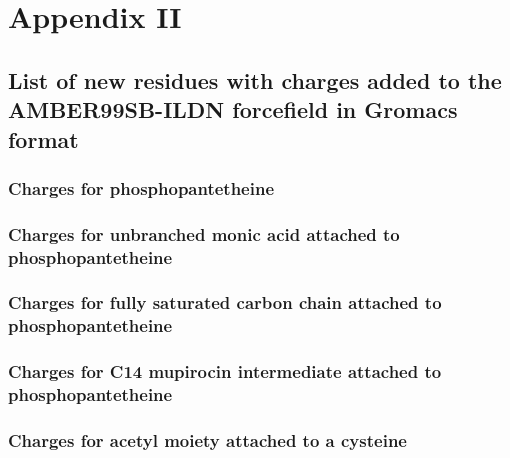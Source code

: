 \chapter{Appendix II}
\label{cha:AppendixII}
\begin{singlespacing}

%

\section{List of new residues with charges added to the AMBER99SB-ILDN forcefield in Gromacs format}
\label{sec:newresidues}
	
	\subsection{Charges for phosphopantetheine}
	\label{sec:SPTcharge}
	

	\subsection{Charges for unbranched monic acid attached to phosphopantetheine}
	\label{sec:SPMcharge}
		
	
	\subsection{Charges for fully saturated carbon chain attached to phosphopantetheine}
	\label{sec:SPCcharge}
		

	\subsection{Charges for C14 mupirocin intermediate attached to phosphopantetheine}
	\label{sec:SPBcharge}
		

	\subsection{Charges for acetyl moiety attached to a cysteine}
	\label{sec:CYAcharge}
		


\end{singlespacing}